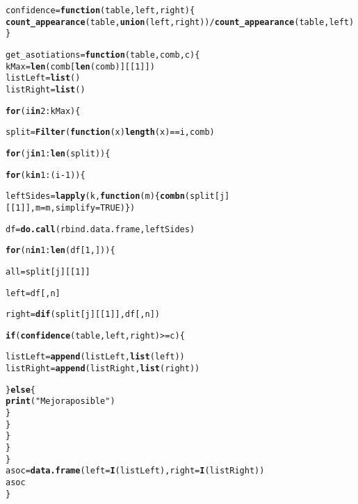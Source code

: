\documentclass[12pt]{report}\usepackage[]{graphicx}\usepackage[dvipsnames]{xcolor}
\makeatletter
\newcommand{\hlnum}[1]{\textcolor[rgb]{0.686,0.059,0.569}{#1}}%
\newcommand{\hlstr}[1]{\textcolor[rgb]{0.192,0.494,0.8}{#1}}%
\newcommand{\hlopt}[1]{\textcolor[rgb]{0,0,0}{#1}}%
\newcommand{\hlstd}[1]{\textcolor[rgb]{0.345,0.345,0.345}{#1}}%
\newcommand{\hlkwa}[1]{\textcolor[rgb]{0.161,0.373,0.58}{\textbf{#1}}}%
\newcommand{\hlkwb}[1]{\textcolor[rgb]{0.69,0.353,0.396}{#1}}%
\newcommand{\hlkwc}[1]{\textcolor[rgb]{0.333,0.667,0.333}{#1}}%
\newcommand{\hlkwd}[1]{\textcolor[rgb]{0.737,0.353,0.396}{\textbf{#1}}}%
\newenvironment{kframe}{%
 \def\at@end@of@kframe{}%
 \ifinner\ifhmode%
  \def\at@end@of@kframe{\end{minipage}}%
  \begin{minipage}{\columnwidth}%
 \fi\fi%
 \def\FrameCommand##1{\hskip\@totalleftmargin \hskip-\fboxsep
 \colorbox{shadecolor}{##1}\hskip-\fboxsep
     \hskip-\linewidth \hskip-\@totalleftmargin \hskip\columnwidth}%
 \MakeFramed {\advance\hsize-\width
   \@totalleftmargin\z@ \linewidth\hsize
   \@setminipage}}%
 {\par\unskip\endMakeFramed%
 \at@end@of@kframe}
\newenvironment{knitrout}{}{} %
\makeatother
\begin{document}
\begin{knitrout}
\begin{kframe}
\begin{alltt}
\hlstd{confidence} \hlkwb{=} \hlkwa{function}\hlstd{(}\hlkwc{table}\hlstd{,} \hlkwc{left}\hlstd{,} \hlkwc{right}\hlstd{) \{}
\hlkwd{count_appearance}\hlstd{(table,} \hlkwd{union}\hlstd{(left, right))} \hlopt{/} \hlkwd{count_appearance}\hlstd{(table, left)}
\hlstd{\}}

\hlstd{get_asotiations} \hlkwb{=} \hlkwa{function}\hlstd{(}\hlkwc{table}\hlstd{,} \hlkwc{comb}\hlstd{,} \hlkwc{c}\hlstd{) \{}
\hlstd{kMax} \hlkwb{=} \hlkwd{len}\hlstd{(comb[}\hlkwd{len}\hlstd{(comb)][[}\hlnum{1}\hlstd{]])}
\hlstd{listLeft} \hlkwb{=} \hlkwd{list}\hlstd{()}
\hlstd{listRight} \hlkwb{=} \hlkwd{list}\hlstd{()}

\hlkwa{for} \hlstd{(i} \hlkwa{in} \hlnum{2}\hlopt{:}\hlstd{kMax) \{}

\hlstd{split} \hlkwb{=} \hlkwd{Filter}\hlstd{(}\hlkwa{function}\hlstd{(}\hlkwc{x}\hlstd{)} \hlkwd{length}\hlstd{(x)}\hlopt{==}\hlstd{i, comb)}

\hlkwa{for} \hlstd{(j} \hlkwa{in} \hlnum{1}\hlopt{:}\hlkwd{len}\hlstd{(split)) \{}

\hlkwa{for} \hlstd{(k} \hlkwa{in} \hlnum{1}\hlopt{:}\hlstd{(i}\hlopt{-}\hlnum{1}\hlstd{)) \{}

\hlstd{leftSides} \hlkwb{=} \hlkwd{lapply}\hlstd{(k,} \hlkwa{function}\hlstd{(}\hlkwc{m}\hlstd{) \{}\hlkwd{combn}\hlstd{(split[j][[}\hlnum{1}\hlstd{]],} \hlkwc{m}\hlstd{=m,} \hlkwc{simplify}\hlstd{=}\hlnum{TRUE}\hlstd{)\})}

\hlstd{df} \hlkwb{=} \hlkwd{do.call}\hlstd{(rbind.data.frame, leftSides)}

\hlkwa{for} \hlstd{(n} \hlkwa{in} \hlnum{1}\hlopt{:}\hlkwd{len}\hlstd{(df[}\hlnum{1}\hlstd{,])) \{}

\hlstd{all} \hlkwb{=} \hlstd{split[j][[}\hlnum{1}\hlstd{]]}

\hlstd{left} \hlkwb{=} \hlstd{df[,n]}

\hlstd{right} \hlkwb{=} \hlkwd{dif}\hlstd{(split[j][[}\hlnum{1}\hlstd{]], df[,n])}

\hlkwa{if} \hlstd{(}\hlkwd{confidence}\hlstd{(table, left, right)} \hlopt{>=} \hlstd{c) \{}

\hlstd{listLeft} \hlkwb{=} \hlkwd{append}\hlstd{(listLeft ,} \hlkwd{list}\hlstd{(left))}
\hlstd{listRight} \hlkwb{=} \hlkwd{append}\hlstd{(listRight ,} \hlkwd{list}\hlstd{(right))}

\hlstd{\}} \hlkwa{else} \hlstd{\{}
\hlkwd{print}\hlstd{(}\hlstr{"Mejora posible"}\hlstd{)}
\hlstd{\}}
\hlstd{\}}
\hlstd{\}}
\hlstd{\}}
\hlstd{\}}
\hlstd{asoc} \hlkwb{=} \hlkwd{data.frame}\hlstd{(}\hlkwc{left} \hlstd{=} \hlkwd{I}\hlstd{(listLeft),} \hlkwc{right} \hlstd{=} \hlkwd{I}\hlstd{(listRight))}
\hlstd{asoc}
\hlstd{\}}


\end{alltt}
\end{kframe}
\end{knitrout}
\end{document}
